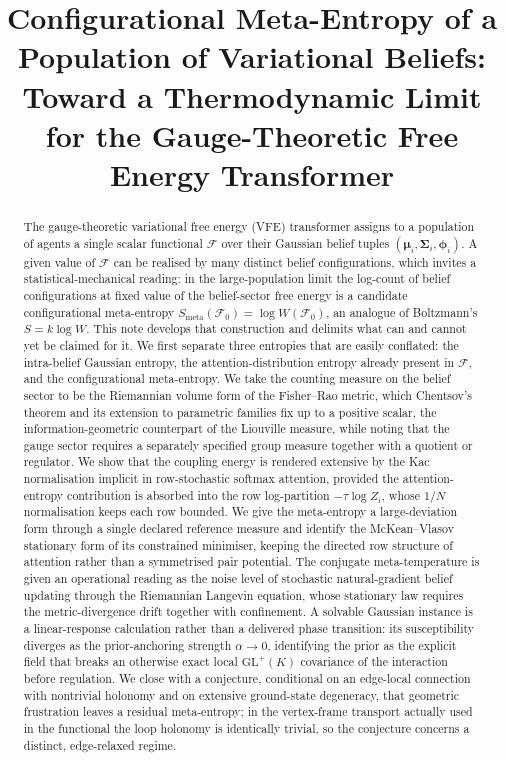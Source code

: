 \documentclass[11pt]{article}
\title{Configurational Meta-Entropy of a Population of Variational Beliefs:\\
Toward a Thermodynamic Limit for the Gauge-Theoretic Free Energy Transformer}
\author{}
\date{}
\theoremstyle{plain}
\theoremstyle{definition}
\newcommand{\GL}{\mathrm{GL}}
\newcommand{\bmu}{\boldsymbol{\mu}}
\newcommand{\bSigma}{\boldsymbol{\Sigma}}
\newcommand{\bphi}{\boldsymbol{\phi}}
\newcommand{\Fcal}{\mathcal{F}}
\newcommand{\Wmeta}{W}
\newcommand{\Smeta}{S_{\mathrm{meta}}}
\begin{document}
\maketitle

\begin{abstract}
The gauge-theoretic variational free energy (VFE) transformer assigns to a population
of agents a single scalar functional $\Fcal$ over their Gaussian belief tuples
$(\bmu_i,\bSigma_i,\bphi_i)$. A given value of $\Fcal$ can be realised by many distinct
belief configurations, which invites a statistical-mechanical reading: in the
large-population limit the log-count of belief configurations at fixed value of the
belief-sector free energy is a
candidate configurational meta-entropy $\Smeta(\Fcal_0)=\log\Wmeta(\Fcal_0)$, an
analogue of Boltzmann's $S=k\log W$. This note develops that construction and delimits
what can and cannot yet be claimed for it. We first separate three entropies that are
easily conflated: the intra-belief Gaussian entropy, the attention-distribution entropy
already present in $\Fcal$, and the configurational meta-entropy. We take the counting
measure on the belief sector to be the Riemannian volume form of the Fisher--Rao metric,
which Chentsov's theorem and its extension to parametric families fix up to a positive
scalar, the information-geometric counterpart of the Liouville measure, while noting
that the gauge sector requires a separately specified group measure together with a
quotient or regulator. We show that the coupling energy is rendered extensive by the
Kac normalisation implicit in row-stochastic softmax attention, provided the
attention-entropy contribution is absorbed into the row log-partition $-\tau\log Z_i$,
whose $1/N$ normalisation keeps each row bounded. We give the meta-entropy a large-deviation
form through a single declared reference measure and identify the McKean--Vlasov
stationary form of its constrained minimiser, keeping the directed row structure of attention rather than a symmetrised
pair potential. The conjugate meta-temperature is given an operational reading as the
noise level of stochastic natural-gradient belief updating through the Riemannian
Langevin equation, whose stationary law requires the metric-divergence drift together
with confinement. A solvable Gaussian instance is a linear-response calculation rather
than a delivered phase transition: its susceptibility diverges as the prior-anchoring
strength $\alpha\to0$, identifying the prior as the explicit field that breaks an
otherwise exact local $\GL^{+}(K)$ covariance of the interaction before regulation. We close with a
conjecture, conditional on an edge-local connection with nontrivial holonomy and on
extensive ground-state degeneracy, that geometric frustration leaves a residual
meta-entropy; in the vertex-frame transport actually used in the functional the loop
holonomy is identically trivial, so the conjecture concerns a distinct, edge-relaxed
regime.
\end{abstract}
\end{document}
